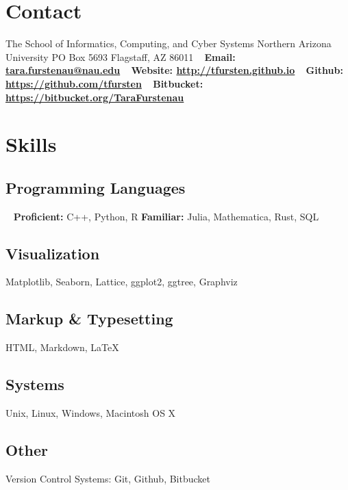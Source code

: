 \documentclass[]{cv-style}          %
\begin{document}
\lastupdated


\begin{aside}
%
\section{Contact}
The School of Informatics, Computing, and Cyber Systems
Northern Arizona University
PO Box 5693
Flagstaff, AZ 86011
~
\textbf{Email:
\href{mailto:tara.furstenau@nau.edu}{tara.furstenau@nau.edu}}
~
\textbf{Website:
\href{http://tfursten.github.io}{http://tfursten.github.io}}
~
\textbf{Github:
\href{https://github.com/tfursten}{https://github.com/tfursten}}
~
\textbf{Bitbucket:
\href{https://bitbucket.org/TaraFurstenau}{https://bitbucket.org/TaraFurstenau}}
%
\section{Skills}
\subsection{Programming Languages}
~
\textbf{Proficient:} C++, Python, R\newline
\textbf{Familiar:} Julia, Mathematica, Rust, SQL
\subsection{Visualization}
Matplotlib, Seaborn, Lattice, ggplot2, ggtree, Graphviz
\subsection{Markup \& Typesetting}
HTML, Markdown, \LaTeX
\subsection{Systems}
Unix, Linux, Windows, Macintosh OS X
\subsection{Other}
Version Control Systems: Git, Github, Bitbucket
%
\end{aside}
\end{document}
